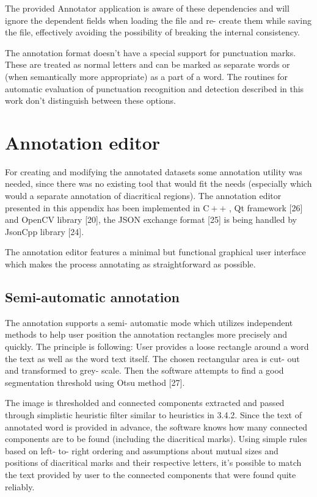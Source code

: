 \documentclass[12pt,a4paper]{report}
\begin{document}
The provided Annotator application is aware of these dependencies and will ignore the dependent fields when loading the file and re- create them while saving the file, effectively avoiding the possibility of breaking the internal consistency.

The annotation format doesn't have a special support for punctuation marks. These are treated as normal letters and can be marked as separate words or (when semantically more appropriate) as a part of a word. The routines for automatic evaluation of punctuation recognition and detection described in this work don't distinguish between these options.

\chapter{Annotation editor}
For creating and modifying the annotated datasets some annotation utility was needed, since there was no existing tool that would fit the needs (especially which would a separate annotation of diacritical regions). The annotation editor presented in this appendix has been implemented in $\mathrm{C++}$ , Qt framework [26] and OpenCV library [20], the JSON exchange format [25] is being handled by JsonCpp library [24].

The annotation editor features a minimal but functional graphical user interface which makes the process annotating as straightforward as possible.

\section{Semi-automatic annotation}
The annotation supports a semi- automatic mode which utilizes independent methods to help user position the annotation rectangles more precisely and quickly. The principle is following: User provides a loose rectangle around a word the text as well as the word text itself. The chosen rectangular area is cut- out and transformed to grey- scale. Then the software attempts to find a good segmentation threshold using Otsu method [27].

The image is thresholded and connected components extracted and passed through simplistic heuristic filter similar to heuristics in 3.4.2. Since the text of annotated word is provided in advance, the software knows how many connected components are to be found (including the diacritical marks). Using simple rules based on left- to- right ordering and assumptions about mutual sizes and positions of diacritical marks and their respective letters, it's possible to match the text provided by user to the connected components that were found quite reliably.
\end{document}

